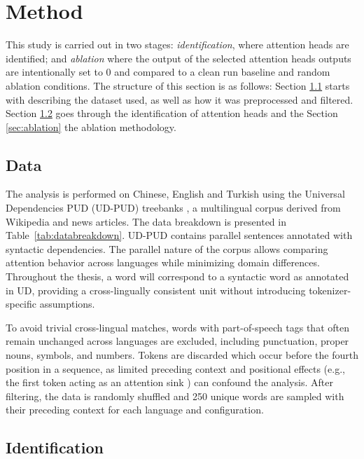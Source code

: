 \chapter{Method} \label{cha:method}

This study is carried out in two stages: \textit{identification}, where attention heads are identified; and \textit{ablation} where the output of the selected attention heads outputs are intentionally set to 0 and compared to a clean run baseline and random ablation conditions. The structure of this section is as follows: Section \ref{sec:data} starts with describing the dataset used, as well as how it was preprocessed and filtered. Section \ref{sec:identification} goes through the identification of attention heads and the Section \ref{sec:ablation} the ablation methodology.

\section{Data}\label{sec:data}

The analysis is performed on Chinese, English and Turkish using the Universal Dependencies PUD (UD-PUD) treebanks \citep{nivre2020, akhundjanova2025}, a multilingual corpus derived from Wikipedia and news articles. The data breakdown is presented in Table~\ref{tab:databreakdown}. UD-PUD contains parallel sentences annotated with syntactic dependencies. The parallel nature of the corpus allows comparing attention behavior across languages while minimizing domain differences. Throughout the thesis, a word will correspond to a syntactic word as annotated in UD, providing a cross-lingually consistent unit without introducing tokenizer-specific assumptions.



To avoid trivial cross-lingual matches, words with part-of-speech tags that often remain unchanged across languages are excluded, including punctuation, proper nouns, symbols, and numbers. Tokens are discarded which occur before the fourth position in a sequence, as limited preceding context and positional effects (e.g., the first token acting as an attention sink \citep{xiao2024efficient}) can confound the analysis. After filtering, the data is randomly shuffled and 250 unique words are sampled with their preceding context for each language and configuration.

\section{Identification}\label{sec:identification}

